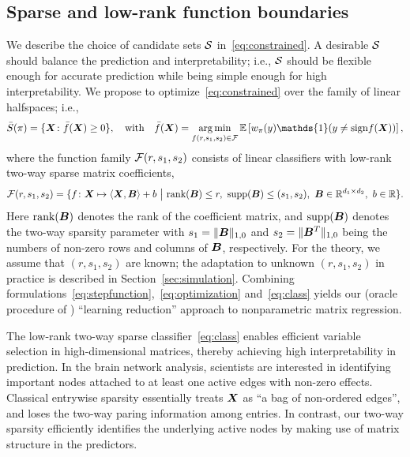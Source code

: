 \documentclass[11pt]{article}
\theoremstyle{plain}
\theoremstyle{definition}
\def\sign{\textup{sign}}
\begin{document}
\subsection{Sparse and low-rank function boundaries}\label{subsec:linear class}
We describe the choice of candidate sets $\mathcal{S}$ in~\eqref{eq:constrained}. A desirable $\mathcal{S}$ should balance the prediction and interpretability; i.e., $\mathcal{S}$ should be flexible enough for accurate prediction while being simple enough for high interpretability. We propose to optimize~\eqref{eq:constrained} over the family of linear halfspaces; i.e.,
\begin{equation}\label{eq:optimization}
\bar S(\pi) = \{\mX\colon\bar f(\mX)\geq 0\},\quad  \text{with}\quad  \bar f(\mX)= \argmin_{f(r,s_1,s_2)\in\tF}\mathbb{E}\left[w_\pi(y)\mathds{1}(y\neq \sign f(\mX))\right],
\end{equation}
where the function family $\mathcal{F}(r,s_1,s_2)$ consists of linear classifiers with low-rank two-way sparse matrix coefficients,
\begin{align}\label{eq:class}
\tF(r,s_1,s_2)=\{f\colon \mX\mapsto \langle \mX, \mB \rangle +b \ \big|\ \text{rank}(\mB)\leq r, \ \text{supp}(\mB)\leq (s_1,s_2), \ \mB\in\mathbb{R}^{d_1\times d_2},\ b\in\mathbb{R}\}.
\end{align}
Here $\text{rank}(\bm B)$ denotes the rank of the coefficient matrix, and $\text{supp}(\bm B)$ denotes the two-way sparsity parameter with $s_1=\lVert\bm B\rVert_{1,0}$ and $s_2=\lVert\bm B^T\rVert_{1,0}$ being the numbers of non-zero rows and columns of $\bm B$, respectively. For the theory, we assume that $(r,s_1,s_2)$ are known; the adaptation to unknown $(r, s_1, s_2)$ in practice is described in Section~\ref{sec:simulation}.  
Combining formulations~\eqref{eq:stepfunction},~\eqref{eq:optimization} and~\eqref{eq:class} yields our (oracle procedure of ) ``learning reduction'' approach to nonparametric matrix regression.


The low-rank two-way sparse classifier~\eqref{eq:class} enables efficient variable selection in high-dimensional matrices, thereby achieving high interpretability in prediction. In the brain network analysis, scientists are interested in identifying important nodes attached to at least one active edges with non-zero effects. Classical entrywise sparsity essentially treats $\bm X$ as ``a bag of non-ordered edges'', and loses the two-way paring information among entries. In contrast, our two-way sparsity efficiently identifies the underlying active nodes by making use of matrix structure in the predictors. 
\end{document}
